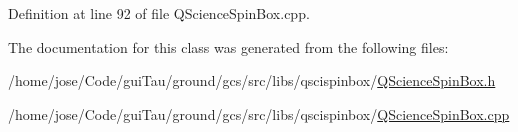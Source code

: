 Definition at line 92 of file Q\-Science\-Spin\-Box.\-cpp.



The documentation for this class was generated from the following files\-:\begin{DoxyCompactItemize}
\item 
/home/jose/\-Code/gui\-Tau/ground/gcs/src/libs/qscispinbox/\hyperlink{_q_science_spin_box_8h}{Q\-Science\-Spin\-Box.\-h}\item 
/home/jose/\-Code/gui\-Tau/ground/gcs/src/libs/qscispinbox/\hyperlink{_q_science_spin_box_8cpp}{Q\-Science\-Spin\-Box.\-cpp}\end{DoxyCompactItemize}
